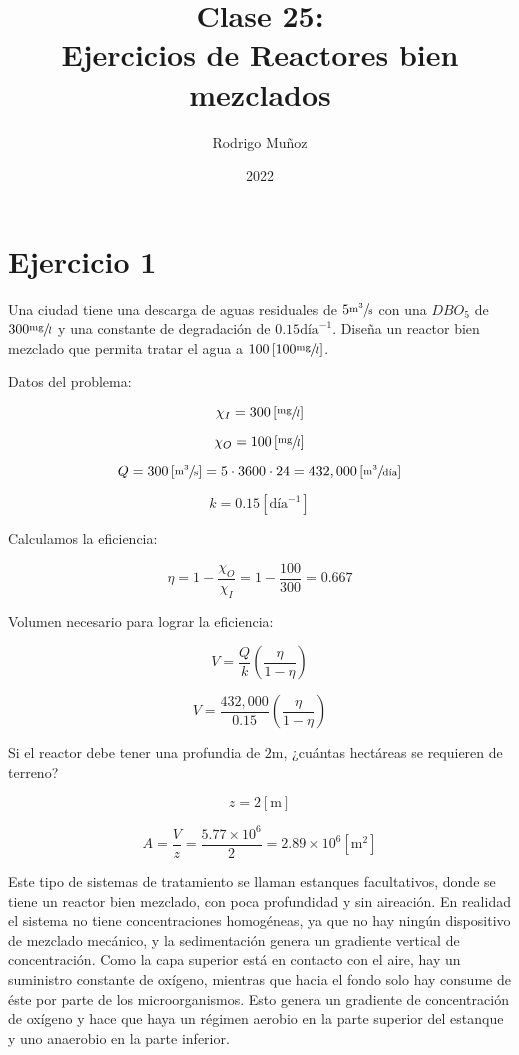 \documentclass[11pt]{article}
\title{Clase 25: \\ Ejercicios de Reactores bien mezclados}
\author{Rodrigo Muñoz}
\date{2022}
\begin{document}
\maketitle

\section{Ejercicio 1}

Una ciudad tiene una descarga de aguas residuales de \( 5 \sfrac{\text{m}^3}{\text{s}} \) con una \( DBO_5 \) de \( 300 \sfrac{\text{mg}}{l} \) y una constante de degradación de \( 0.15 \text{día}^{-1} \). Diseña un reactor bien mezclado que permita tratar el agua a \( 100 \left[ 100 \sfrac{\text{mg}}{l} \right] \).

\bigskip \bigskip

Datos del problema:

\[ \chi_I = 300 \left[ \sfrac{\text{mg}}{l} \right] \]

\[ \chi_O = 100 \left[ \sfrac{\text{mg}}{l} \right] \]

\[ Q = 300 \left[ \sfrac{\text{m}^3}{\text{s}} \right] = 5 \cdot 3600 \cdot 24 = 432,000 \left[ \sfrac{\text{m}^3}{\text{día}} \right] \]

\[ k = 0.15 \left[ \text{día}^{-1} \right] \]

Calculamos la eficiencia:

\[ \eta = 1 - \frac{\chi_O}{\chi_I} = 1 - \frac{100}{300} = 0.667 \]

Volumen necesario para lograr la eficiencia:

\[ V = \frac{Q}{k} \left( \frac{\eta}{ 1 - \eta } \right) \]

\[ V = \frac{432,000}{0.15} \left( \frac{\eta}{ 1 - \eta } \right) \]

Si el reactor debe tener una profundia de \( 2 \text{m} \), ¿cuántas hectáreas se requieren de terreno?

\[ z = 2 \left[ \text{m} \right] \]

\[ A = \frac{V}{z} = \frac{5.77 \times 10^6}{2} = 2.89 \times 10^6 \left[ \text{m}^2 \right] \]

Este tipo de sistemas de tratamiento se llaman estanques facultativos, donde se tiene un reactor bien mezclado, con poca profundidad y sin aireación. En realidad el sistema no tiene concentraciones homogéneas, ya que no hay ningún dispositivo de mezclado mecánico, y la sedimentación genera un gradiente vertical de concentración. Como la capa superior está en contacto con el aire, hay un suministro constante de oxígeno, mientras que hacia el fondo solo hay consume de éste por parte de los microorganismos. Esto genera un gradiente de concentración de oxígeno y hace que haya un régimen aerobio en la parte superior del estanque y uno anaerobio en la parte inferior.
\end{document}
